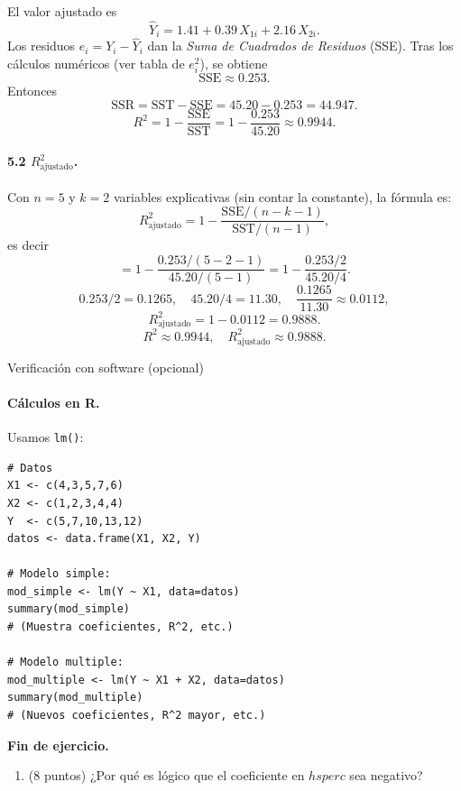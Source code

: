 \documentclass[10pt,a4paper]{article}
\begin{document}
\begin{enumerate}
El valor ajustado es
\[
\hat{Y}_i
= 1.41 + 0.39\,X_{1i} + 2.16\,X_{2i}.
\]
Los residuos $e_i=Y_i-\hat{Y}_i$ dan la \emph{Suma de Cuadrados de Residuos} (SSE). Tras los cálculos numéricos (ver tabla de $e_i^2$), se obtiene
\[
\text{SSE} \approx 0.253.
\]
Entonces
\[
\text{SSR}
= \text{SST} - \text{SSE}
= 45.20 - 0.253
= 44.947.
\]
\[
R^2
= 1-\frac{\text{SSE}}{\text{SST}}
= 1 - \frac{0.253}{45.20}
\approx 0.9944.
\]

\paragraph{5.2 $R_{\text{ajustado}}^2$.}

Con $n=5$ y $k=2$ variables explicativas (sin contar la constante), la fórmula es:
\[
R_{\text{ajustado}}^2
= 1
- 
\frac{\text{SSE}/(n-k-1)}{\text{SST}/(n-1)},
\]
es decir
\[
= 1
- 
\frac{0.253/(5-2-1)}{45.20/(5-1)}
= 1
- 
\frac{0.253/2}{45.20/4}.
\]
\[
0.253/2 = 0.1265,
\quad
45.20/4=11.30,
\quad
\frac{0.1265}{11.30}\approx 0.0112,
\]
\[
R_{\text{ajustado}}^2
= 1-0.0112
= 0.9888.
\]
\[
\boxed{
R^2 \approx 0.9944,
\quad
R_{\text{ajustado}}^2 \approx 0.9888.
}
\]


Verificaci\'on con software (opcional)

\paragraph{ C\'alculos en R.} Usamos \texttt{lm()}:

\begin{lstlisting}
# Datos
X1 <- c(4,3,5,7,6)
X2 <- c(1,2,3,4,4)
Y  <- c(5,7,10,13,12)
datos <- data.frame(X1, X2, Y)

# Modelo simple:
mod_simple <- lm(Y ~ X1, data=datos)
summary(mod_simple)
# (Muestra coeficientes, R^2, etc.)

# Modelo multiple:
mod_multiple <- lm(Y ~ X1 + X2, data=datos)
summary(mod_multiple)
# (Nuevos coeficientes, R^2 mayor, etc.)
\end{lstlisting}


\textbf{Fin de ejercicio.}


\begin{enumerate} 
\item (8 puntos) ¿Por qué es lógico que el coeficiente en $hsperc$ sea negativo?


\end{enumerate}
\end{enumerate}
\end{document}

